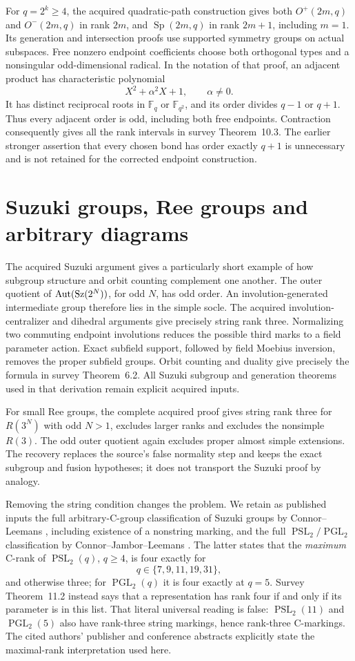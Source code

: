 \documentclass[11pt]{article}
\newcommand{\PSL}{\operatorname{PSL}}\newcommand{\PGL}{\operatorname{PGL}}
\newcommand{\Sp}{\operatorname{Sp}}\newcommand{\Aut}{\operatorname{Aut}}
\newcommand{\note}[1]{\marginpar{\raggedright\scriptsize #1}}
\begin{document}
For $q=2^k\ge4$, the acquired quadratic-path construction gives both
$O^+(2m,q)$ and $O^-(2m,q)$ in rank $2m$, and $\Sp(2m,q)$ in
rank $2m+1$, including $m=1$. Its generation and intersection proofs
use supported symmetry groups on actual subspaces. Free nonzero
endpoint coefficients choose both orthogonal types and a nonsingular
odd-dimensional radical. In the notation of that proof, an adjacent
product has characteristic polynomial
\[
                         X^2+\alpha^2X+1,\qquad\alpha\ne0.
\]
It has distinct reciprocal roots in $\mathbb F_q$ or
$\mathbb F_{q^2}$, and its order divides $q-1$ or $q+1$.
Thus every adjacent order is odd, including both free endpoints.
Contraction consequently gives all the rank intervals in survey
Theorem~10.3. The earlier stronger assertion that every chosen bond
has order exactly $q+1$ is unnecessary and is not retained for the
corrected endpoint construction.

\section{Suzuki groups, Ree groups and arbitrary diagrams}
The acquired Suzuki argument gives a particularly short example of
how subgroup structure and orbit counting complement one another.
The outer quotient of $\Aut(\Sz(2^N))$, for odd $N$, has odd order.
An involution-generated intermediate group therefore lies in the
simple socle. The acquired involution-centralizer and dihedral
arguments give precisely string rank three. Normalizing two commuting
endpoint involutions reduces the possible third marks to a field
parameter action. Exact subfield support, followed by field
Moebius inversion, removes the proper subfield groups. Orbit counting
and duality give precisely the formula in survey Theorem~6.2.
All Suzuki subgroup and generation theorems used in that derivation
remain explicit acquired inputs.

For small Ree groups, the complete acquired proof gives string rank
three for $R(3^N)$ with odd $N>1$, excludes larger ranks and excludes
the nonsimple $R(3)$. The odd outer quotient again excludes proper
almost simple extensions. The recovery replaces the source's false
normality step and keeps the exact subgroup and fusion hypotheses;
it does not transport the Suzuki proof by analogy.

Removing the string condition changes the problem. We retain as
published inputs the full arbitrary-C-group classification of Suzuki
groups by Connor--Leemans \cite{suzukiC}, including existence of a
nonstring marking, and the full $\PSL_2/\PGL_2$ classification by
Connor--Jambor--Leemans \cite{linearC}. The latter states that the
\emph{maximum} C-rank of $\PSL_2(q)$, $q\ge4$, is four exactly for
\[
                              q\in\{7,9,11,19,31\},
\]
and otherwise three; for $\PGL_2(q)$ it is four exactly at $q=5$.
\note{Correction}
Survey Theorem~11.2 instead says that a representation has rank four
if and only if its parameter is in this list. That literal universal
reading is false: $\PSL_2(11)$ and $\PGL_2(5)$ also have rank-three
string markings, hence rank-three C-markings. The cited authors'
publisher and conference abstracts explicitly state the maximal-rank
interpretation used here.
\end{document}
